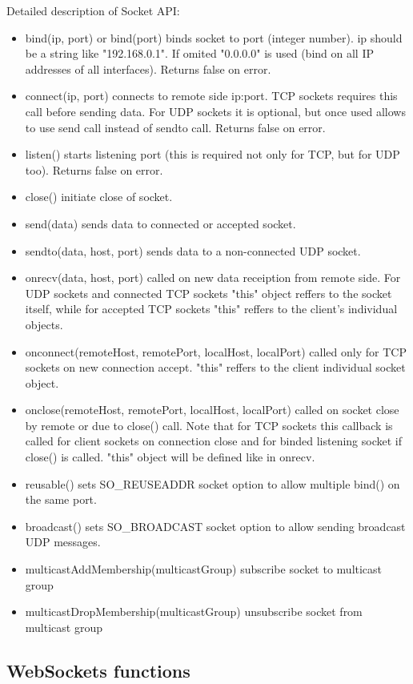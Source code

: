 Detailed description of Socket API:
\begin{itemize}
\item bind(ip, port) or bind(port) binds socket to port (integer number). ip should be a string like "192.168.0.1". If omited "0.0.0.0" is used (bind on all IP addresses of all interfaces). Returns false on error.
\item connect(ip, port) connects to remote side ip:port. TCP sockets requires this call before sending data. For UDP sockets it is optional, but once used allows to use send call instead of sendto call. Returns false on error.
\item listen() starts listening port (this is required not only for TCP, but for UDP too). Returns false on error.
\item close() initiate close of socket.
\item send(data) sends data to connected or accepted socket.
\item sendto(data, host, port) sends data to a non-connected UDP socket.
\item onrecv(data, host, port) called on new data receiption from remote side. For UDP sockets and connected TCP sockets "this" object reffers to the socket itself, while for accepted TCP sockets "this" reffers to the client's individual objects.
\item onconnect(remoteHost, remotePort, localHost, localPort) called only for TCP sockets on new connection accept. "this" reffers to the client individual socket object.
\item onclose(remoteHost, remotePort, localHost, localPort) called on socket close by remote or due to close() call. Note that for TCP sockets this callback is called for client sockets on connection close and for binded listening socket if close() is called. "this" object will be defined like in onrecv.
\item reusable() sets SO\_REUSEADDR socket option to allow multiple bind() on the same port.
\item broadcast() sets SO\_BROADCAST socket option to allow sending broadcast UDP messages.
\item multicastAddMembership(multicastGroup) subscribe socket to multicast group
\item multicastDropMembership(multicastGroup) unsubscribe socket from multicast group
\end{itemize}

\subsection{WebSockets functions}

